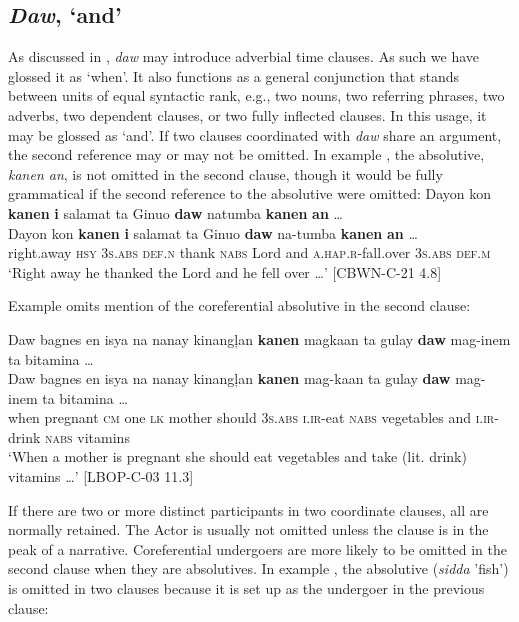 \subsection{\textit{Daw}, ‘and’}
\label{sec:daw}
As discussed in , \textit{daw} may introduce adverbial time clauses. As such we have glossed it as ‘when’. It also functions as a general conjunction that stands between units of equal syntactic rank, e.g., two nouns, two referring phrases, two adverbs, two dependent clauses, or two fully inflected clauses. In this usage, it may be glossed as ‘and’.  If two clauses coordinated with \textit{daw} share an  argument, the second reference may or may not be omitted. In example , the absolutive, \textit{kanen an}, is not omitted in the second clause, though it would be fully grammatical if the second reference to the absolutive were omitted:
\ea
\label{ex:hefellover}
Dayon kon \textbf{kanen} \textbf{i} salamat ta Ginuo \textbf{daw} natumba \textbf{kanen} \textbf{an} … \smallskip\\
\gll Dayon kon \textbf{kanen} \textbf{i} salamat ta Ginuo \textbf{daw} na-tumba \textbf{kanen} \textbf{an} … \\
right.away \textsc{hsy} 3\textsc{s.abs} \textsc{def.n} thank \textsc{nabs} Lord and \textsc{a.hap.r}-fall.over 3\textsc{s.abs} \textsc{def.m} \\
\glt ‘Right away he thanked the Lord and he fell over …’ [CBWN-C-21 4.8]
\z

Example  omits mention of the coreferential absolutive in the second clause:

\ea
\label{ex:drinkvitamins}
Daw bagnes en isya na nanay kinangļan \textbf{kanen} magkaan ta gulay \textbf{daw} mag-inem ta bitamina …\\\smallskip
\gll Daw bagnes en isya na nanay kinangļan \textbf{kanen} mag-kaan ta gulay \textbf{daw} mag-inem ta bitamina … \\
when pregnant \textsc{cm} one \textsc{lk} mother should 3\textsc{s.abs} \textsc{i.ir}-eat \textsc{nabs} vegetables and \textsc{i.ir}-drink \textsc{nabs} vitamins \\
\glt ‘When a mother is pregnant she should eat vegetables and take (lit. drink) vitamins …’ [LBOP-C-03 11.3]
\z

If there are two or more distinct participants in two coordinate clauses, all are normally retained. The Actor is usually not omitted unless the clause is in the peak of a narrative. Coreferential undergoers are more likely to be omitted in the second clause when they are absolutives. In example , the absolutive (\textit{sidda} 'fish') is omitted in two clauses because it is set up as the undergoer in the previous clause:

